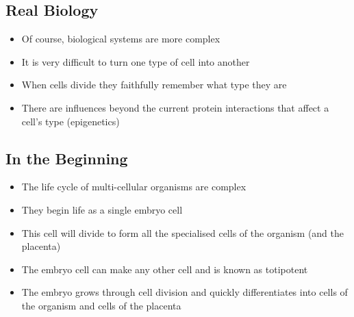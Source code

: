 
\begin{slide}
\section{Real Biology}

\begin{PauseHighLight}
  \begin{itemize}
  \item Of course, biological systems are more complex\pause
  \item It is very difficult to turn one type of cell into another\pause
  \item When cells divide they faithfully remember what type they
    are\pause
  \item There are influences beyond the current protein interactions
    that affect a cell's type (epigenetics)\pause
  \end{itemize}
\end{PauseHighLight}

\end{slide}



\Outline %

\begin{slide}
\section{In the Beginning}

\begin{PauseHighLight}
  \begin{itemize}
  \item The life cycle of multi-cellular organisms are complex\pause 
  \item They begin life as a single embryo cell\pause
  \item This cell will divide to form all the specialised cells of the
    organism (and the placenta)\pause
  \item The embryo cell can make any other cell and is known as totipotent\pause
  \item The embryo grows through cell division and quickly
    differentiates into cells of the organism and cells of the
    placenta\pause
  \end{itemize}
\end{PauseHighLight}

\end{slide}

